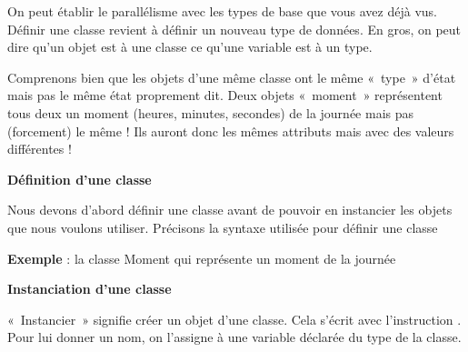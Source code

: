 On peut établir le parallélisme avec les types de base que vous avez
déjà vus. Définir une classe revient à définir un nouveau type de
données. En gros, on peut dire qu'un\textbf{ }objet
est à une classe ce qu'une variable est à un type.

Comprenons bien que les objets d'une même classe ont le
même «~type~» d'état mais pas le même état proprement
dit. Deux objets «~moment~» représentent tous deux un moment 
(heures, minutes, secondes) de la journée mais pas (forcement) 
le même ! Ils auront donc les mêmes attributs mais
avec des valeurs différentes !

{\sffamily\bfseries\upshape
Définition d'une classe}

{
Nous devons d'abord définir une classe avant de pouvoir
en instancier les objets que nous voulons utiliser. Précisons la
syntaxe utilisée pour définir une classe}


\clearpage

{
\textbf{Exemple} : la classe Moment qui représente un moment de la
journée}


\bigskip

{\sffamily\bfseries\upshape
Instanciation d'une classe}

{«~Instancier~» signifie créer un objet d'une classe.
Cela s'écrit avec l'instruction
. Pour lui donner un nom, on
l'assigne à une variable déclarée du type de la
classe.}

